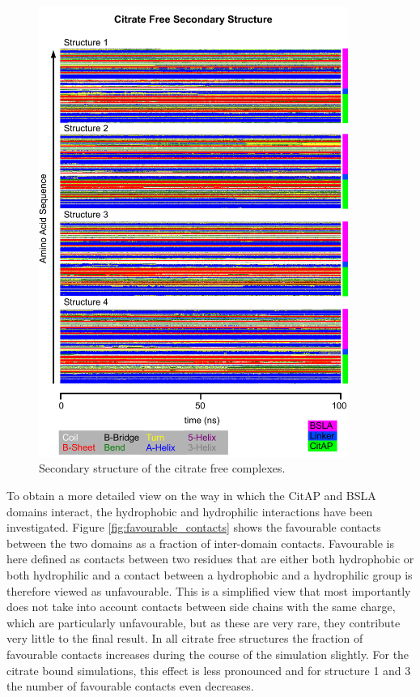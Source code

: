 \documentclass[english, a4paper, 12pt, titlepage, draft]{article}
\begin{document}
\begin{figure}
    \centering
    \includegraphics[width=0.9\textwidth]{figures/DSSP/dssp_free.pdf}
    \caption{Secondary structure of the citrate free complexes.}
    \label{fig:DSSP_free}
\end{figure}



To obtain a more detailed view on the way in which the CitAP and BSLA domains interact, the hydrophobic and hydrophilic interactions have been investigated.
Figure \ref{fig:favourable_contacts} shows the favourable contacts between the two domains as a fraction of inter-domain contacts.
Favourable is here defined as contacts between two residues that are either both hydrophobic or both hydrophilic and a contact between a hydrophobic and a hydrophilic group is therefore viewed as unfavourable.
This is a simplified view that most importantly does not take into account contacts between side chains with the same charge, which are particularly unfavourable, but as these are very rare, they contribute very little to the final result.
In all citrate free structures the fraction of favourable contacts increases during the course of the simulation slightly.
For the citrate bound simulations, this effect is less pronounced and for structure 1 and 3 the number of favourable contacts even decreases.
\end{document}
